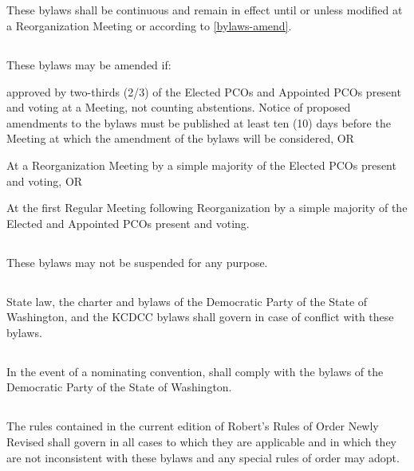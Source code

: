 \subsection{}
These bylaws shall be continuous and remain in effect until or unless modified at a Reorganization Meeting or according to \autoref{bylaws-amend}.

\subsection{}
\label{bylaws-amend}
These bylaws may be amended if:
\begin{inlinealphalist}
    \item approved by two-thirds (2/3) of the Elected PCOs and Appointed PCOs present and voting at a Meeting, not counting abstentions. Notice of proposed amendments to the bylaws must be published at least ten (10) days before the Meeting at which the amendment of the bylaws will be considered, OR
    \item At a Reorganization Meeting by a simple majority of the Elected PCOs present and voting, OR
    \item At the first Regular Meeting following Reorganization by a simple majority of the Elected and Appointed PCOs present and voting.
\end{inlinealphalist}

\subsection{}
These bylaws may not be suspended for any purpose.

\subsection{}
State law, the charter and bylaws of the Democratic Party of the State of Washington, and the KCDCC bylaws shall govern in case of conflict with these bylaws.

\subsection{}
In the event of a nominating convention, \thedistrict{} shall comply with the bylaws of the Democratic Party of the State of Washington.

\subsection{}
The rules contained in the current edition of Robert’s Rules of Order Newly Revised shall govern \thedistrict{} in all cases to which they are applicable and in which they are not inconsistent with these bylaws and any special rules of order \thedistrict{} may adopt.

